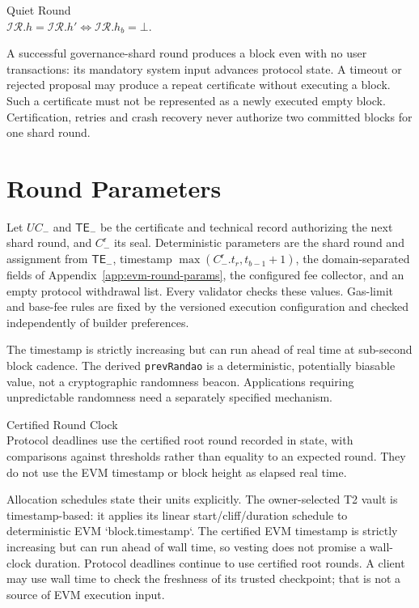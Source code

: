 \begin{ruledef*}{Quiet Round} \\
 $\mathcal{IR}.h=\mathcal{IR}.h' \iff \mathcal{IR}.h_b=\bot$.
\end{ruledef*}

A successful governance-shard round produces a block even with no user transactions: its mandatory system input advances protocol state. A timeout or rejected proposal may produce a repeat certificate without executing a block. Such a certificate must not be represented as a newly executed empty block. Certification, retries and crash recovery never authorize two committed blocks for one shard round.

\section{Round Parameters}\label{sec:evm-round-params}

Let $UC_-$ and $\mathsf{TE}_-$ be the certificate and technical record authorizing the next shard round, and $C^\mathsf{r}_-$ its seal. Deterministic parameters are the shard round and assignment from $\mathsf{TE}_-$, timestamp $\max(C^\mathsf{r}_-.t_r,t_{b-1}+1)$, the domain-separated fields of Appendix~\ref{app:evm-round-params}, the configured fee collector, and an empty protocol withdrawal list. Every validator checks these values. Gas-limit and base-fee rules are fixed by the versioned execution configuration and checked independently of builder preferences.

The timestamp is strictly increasing but can run ahead of real time at sub-second block cadence. The derived \texttt{prevRandao} is a deterministic, potentially biasable value, not a cryptographic randomness beacon. Applications requiring unpredictable randomness need a separately specified mechanism.

\begin{ruledef*}{Certified Round Clock} \\
 Protocol deadlines use the certified root round recorded in state, with comparisons against thresholds rather than equality to an expected round. They do not use the EVM timestamp or block height as elapsed real time.
\end{ruledef*}

Allocation schedules state their units explicitly. The owner-selected T2 vault is timestamp-based: it applies its linear start/cliff/duration schedule to deterministic EVM `block.timestamp`. The certified EVM timestamp is strictly increasing but can run ahead of wall time, so vesting does not promise a wall-clock duration. Protocol deadlines continue to use certified root rounds. A client may use wall time to check the freshness of its trusted checkpoint; that is not a source of EVM execution input.

